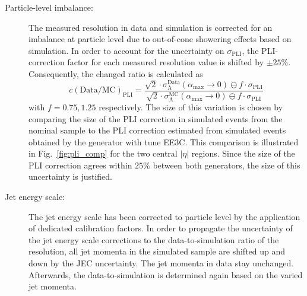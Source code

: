 \begin{description}
 \item[Particle-level imbalance:] 
The measured resolution in data and simulation is corrected for an imbalance at particle level due to out-of-cone showering effects based on simulation. In order to account for the uncertainty on $\sigma_\mathrm{PLI}$, the PLI-correction factor for each measured resolution value is shifted by $\pm 25\%$. Consequently, the changed ratio is calculated as
 \begin{equation}
  c\mathrm{(Data/MC)_{PLI}} = \frac{\sqrt{2} \cdot \sigma^\mathrm{Data}_\mathrm{A}(\alpha_\mathrm{max} \rightarrow 0) \ominus f \cdot \sigma_\mathrm{PLI}}{\sqrt{2} \cdot \sigma^\mathrm{MC}_\mathrm{A}(\alpha_\mathrm{max} \rightarrow 0) \ominus f \cdot \sigma_\mathrm{PLI}}  
 \end{equation}
with $f=0.75, 1.25$ respectively. The size of this variation is chosen by comparing the size of the PLI correction in simulated events from the nominal \pythia sample to the PLI correction estimated from simulated events obtained by the \herwig generator with tune EE3C. This comparison is illustrated in Fig.~\ref{fig:pli_comp} for the two central $|\eta|$ regions. Since the size of the PLI correction agrees within $25\%$ between both generators, the size of this uncertainty is justified.
 
 \item[Jet energy scale:] The jet energy scale has been corrected to particle level by the application of dedicated calibration factors. In order to propagate the uncertainty of the jet energy scale corrections to the data-to-simulation ratio of the resolution, all jet momenta in the simulated sample are shifted up and down by the JEC uncertainty. The jet momenta in data stay unchanged. Afterwards, the data-to-simulation is determined again based on the varied jet momenta.


\end{description}
